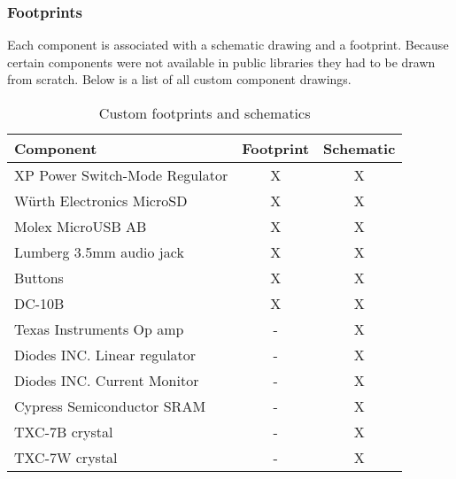 \subsubsection{Footprints}

Each component is associated with a schematic drawing and a footprint. Because certain components were not available in public libraries they had to be drawn from scratch. Below is a list of all custom component drawings.

\begin{table}[H]
	\centering
	\begin{tabular}{| l | c | c |}
		\hline
		\textbf{Component} & \textbf{Footprint}  & \textbf{Schematic} \\
		\hline
		XP Power Switch-Mode Regulator & X & X \\
		Würth Electronics MicroSD & X & X \\
		Molex MicroUSB AB & X & X \\
		Lumberg 3.5mm audio jack & X & X \\
		Buttons & X & X \\
		DC-10B & X & X \\
		\hline
		Texas Instruments Op amp & - & X \\
		Diodes INC. Linear regulator& - & X \\
		Diodes INC. Current Monitor & - & X \\
		Cypress Semiconductor SRAM & - & X \\
		TXC-7B crystal & - & X \\
		TXC-7W crystal & - & X \\
		\hline
	\end{tabular}
	\caption{Custom footprints and schematics}
	\label{tab:footprints}
\end{table}
